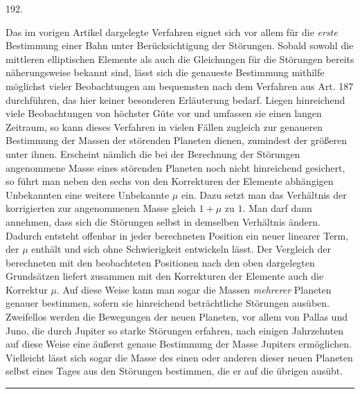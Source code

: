 \begin{center}\hypertarget{native-266-article192}{}192.\end{center}
Das im vorigen Artikel dargelegte Verfahren eignet sich vor allem für die
\emph{erste} Bestimmung einer Bahn unter Berücksichtigung der Störungen.
Sobald sowohl die mittleren elliptischen Elemente als auch die
Gleichungen für die Störungen bereits näherungsweise bekannt sind, lässt
sich die genaueste Bestimmung mithilfe möglichst vieler Beobachtungen am
bequemsten nach dem Verfahren aus Art. 187 durchführen, das hier keiner
besonderen Erläuterung bedarf. Liegen hinreichend viele Beobachtungen
von höchster Güte vor und umfassen sie einen langen Zeitraum, so kann
dieses Verfahren in vielen Fällen zugleich zur genaueren Bestimmung
der Massen der störenden Planeten dienen, zumindest der größeren unter
ihnen. Erscheint nämlich die bei der Berechnung der Störungen
angenommene Masse eines störenden Planeten noch nicht hinreichend
gesichert, so führt man neben den sechs von den Korrekturen der Elemente
abhängigen Unbekannten eine weitere Unbekannte $\mu$ ein. Dazu setzt man
das Verhältnis der korrigierten zur angenommenen Masse gleich $1+\mu$
zu $1$. Man darf dann annehmen, dass sich die Störungen selbst in
demselben Verhältnis ändern. Dadurch entsteht offenbar in jeder
berechneten Position ein neuer linearer Term, der $\mu$ enthält und
sich ohne Schwierigkeit entwickeln lässt. Der Vergleich der berechneten
mit den beobachteten Positionen nach den oben dargelegten
Grundsätzen liefert zusammen mit den Korrekturen der Elemente
auch die Korrektur $\mu$. Auf diese Weise kann man sogar die Massen
\emph{mehrerer} Planeten genauer bestimmen, sofern sie hinreichend
beträchtliche Störungen ausüben. Zweifellos werden die Bewegungen der
neuen Planeten, vor allem von Pallas und Juno, die durch Jupiter so
starke Störungen erfahren, nach einigen Jahrzehnten auf diese Weise
eine äußerst genaue Bestimmung der Masse Jupiters ermöglichen. Vielleicht
lässt sich sogar die Masse des einen oder anderen dieser neuen
Planeten selbst eines Tages aus den Störungen bestimmen, die er auf die
übrigen ausübt.
\begin{center}\rule{3cm}{.4pt}\end{center}
